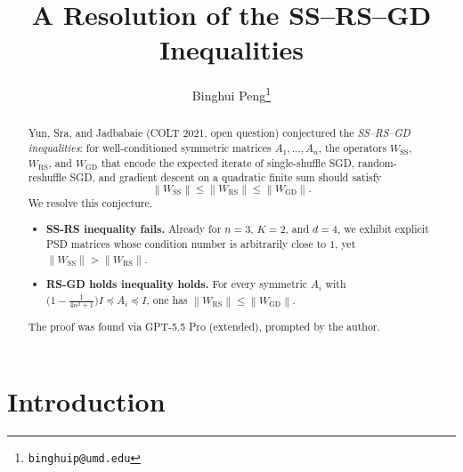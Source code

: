 \documentclass[11pt]{article}
\title{A Resolution of the SS--RS--GD Inequalities}
\author{Binghui Peng\footnote{\texttt{binghuip@umd.edu}}}
\date{}
\theoremstyle{definition}
\theoremstyle{remark}
\newcommand{\norm}[1]{\left\lVert #1 \right\rVert}
\newcommand{\Wss}{W_{\mathrm{SS}}}
\newcommand{\Wrs}{W_{\mathrm{RS}}}
\newcommand{\Wgd}{W_{\mathrm{GD}}}
\newcommand{\psdle}{\preceq}
\begin{document}
\maketitle





\begin{abstract}
Yun, Sra, and Jadbabaie (COLT 2021, open question) conjectured the \emph{SS--RS--GD inequalities}: for well-conditioned symmetric matrices $A_1,\dots,A_n$, the operators $\Wss$, $\Wrs$, and $\Wgd$ that
encode the expected iterate of single-shuffle SGD, random-reshuffle SGD, and gradient descent on a
quadratic finite sum should satisfy
\[
  \norm{\Wss}\le\norm{\Wrs}\le\norm{\Wgd}.
\]
We resolve this conjecture.
\begin{itemize}
  \item \textbf{SS-RS inequality fails.} Already for $n=3$, $K=2$, and $d=4$, we exhibit explicit
  PSD matrices whose condition number is arbitrarily close to $1$, yet
  $\norm{\Wss}>\norm{\Wrs}$. 

  \item \textbf{RS-GD holds inequality holds.} For every symmetric $A_i$ with $\bigl(1-\frac1{4n^2+1}\bigr)I\psdle A_i\psdle I$, one has
  $\norm{\Wrs}\le\norm{\Wgd}$. 
\end{itemize}

The proof was found via GPT-5.5 Pro (extended), prompted by the author.
\end{abstract}

\section{Introduction}\label{sec:intro}
\end{document}
